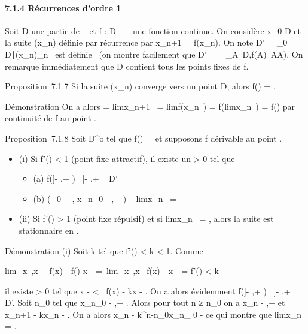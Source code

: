 \documentclass[]{article}
\begin{document}
\paragraph{7.1.4 Récurrences d'ordre 1}

Soit D une partie de ~ et f : D \rightarrow~ ~ une fonction continue. On considère
x\_0 \in D et la suite (x\_n) définie par récurrence par
x\_n+1 = f(x\_n). On note D' =
\x\_0 \in
D∣(x\_n)\_n\in{}~\text
est définie \ (on montre facilement que D'
= \⋃ ~
\_A\subset~D,f(A)\subset~AA). On remarque immédiatement que D contient tous les
points fixes de f.

Proposition~7.1.7 Si la suite (x\_n) converge vers un point \ell \in
D, alors f(\ell) = \ell.

Démonstration On a alors \ell = limx\_n+1~
= limf(x\_n~) =
f(limx\_n~) = f(\ell) par continuité de f
au point \ell.

Proposition~7.1.8 Soit \ell \in D^o tel que f(\ell) = \ell et supposons
f dérivable au point \ell.

\begin{itemize}
\itemsep1pt\parskip0pt
\item
  (i) Si \textbar{}f'(\ell)\textbar{} \textless{} 1 (point fixe attractif),
  il existe un \eta \textgreater{} 0 tel que

  \begin{itemize}
  \itemsep1pt\parskip0pt
  \item
    (a) f({]}\ell - \eta,\ell + \eta{[}) \subset~{]}\ell - \eta,\ell + \eta{[}\subset~ D'
  \item
    (b) \left (\existsn\_0~ \in
    ~, x\_n\_0 \in{]}\ell - \eta,\ell + \eta{[}\right )
    \rigtharrow~ limx\_n~ = \ell
  \end{itemize}
\item
  (ii) Si \textbar{}f'(\ell)\textbar{} \textgreater{} 1 (point fixe
  répulsif) et si limx\_n~ = \ell, alors
  la suite est stationnaire en \ell.
\end{itemize}

Démonstration (i) Soit k tel que \textbar{}f'(\ell)\textbar{} \textless{} k
\textless{} 1. Comme

lim\_x\rightarrow~\ell,x\neq~\ell~\left
\textbar{} f(x) - f(\ell) \over x - \ell
\right \textbar{} =\
lim\_x\rightarrow~\ell,x\neq~\ell\left
\textbar{} f(x) - \ell \over x - \ell \right
\textbar{} = \textbar{}f'(\ell)\textbar{} \textless{} k

il existe \eta \textgreater{} 0 tel que \textbar{}x - \ell\textbar{}
\textless{} \eta \rigtharrow~\textbar{}f(x) - \ell\textbar{}\leq k\textbar{}x - \ell\textbar{}.
On a alors évidemment f({]}\ell - \eta,\ell + \eta{[}) \subset~{]}\ell - \eta,\ell + \eta{[}\subset~ D'. Soit
n\_0 tel que x\_n\_0 \in{]}\ell - \eta,\ell + \eta{[}. Alors
pour tout n ≥ n\_0 on a x\_n \in{]}\ell - \eta,\ell + \eta{[} et
\textbar{}x\_n+1 - \ell\textbar{}\leq k\textbar{}x\_n -
\ell\textbar{}. On a alors \textbar{}x\_n - \ell\textbar{}\leq
k^n-n\_0\textbar{}x\_n\_ 0 -
\ell\textbar{} ce qui montre que limx\_n~
= \ell.
\end{document}
